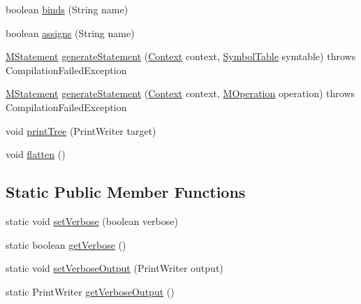 \begin{DoxyCompactItemize}
\item 
boolean \hyperlink{classorg_1_1tzi_1_1use_1_1parser_1_1soil_1_1ast_1_1_a_s_t_statement_af84e3da40a23acdb0af15a7e515d4e41}{binds} (String name)
\item 
boolean \hyperlink{classorg_1_1tzi_1_1use_1_1parser_1_1soil_1_1ast_1_1_a_s_t_statement_a931985140653af5b5100d44fe3125515}{assigns} (String name)
\item 
\hyperlink{classorg_1_1tzi_1_1use_1_1uml_1_1sys_1_1soil_1_1_m_statement}{M\-Statement} \hyperlink{classorg_1_1tzi_1_1use_1_1parser_1_1soil_1_1ast_1_1_a_s_t_statement_adde8e3bf9f9f8f7da35f048332f43911}{generate\-Statement} (\hyperlink{classorg_1_1tzi_1_1use_1_1parser_1_1_context}{Context} context, \hyperlink{classorg_1_1tzi_1_1use_1_1util_1_1soil_1_1_symbol_table}{Symbol\-Table} symtable)  throws Compilation\-Failed\-Exception 
\item 
\hyperlink{classorg_1_1tzi_1_1use_1_1uml_1_1sys_1_1soil_1_1_m_statement}{M\-Statement} \hyperlink{classorg_1_1tzi_1_1use_1_1parser_1_1soil_1_1ast_1_1_a_s_t_statement_a204e82d4871c6ce80f0badf73da6a553}{generate\-Statement} (\hyperlink{classorg_1_1tzi_1_1use_1_1parser_1_1_context}{Context} context, \hyperlink{classorg_1_1tzi_1_1use_1_1uml_1_1mm_1_1_m_operation}{M\-Operation} operation)  throws Compilation\-Failed\-Exception 
\item 
void \hyperlink{classorg_1_1tzi_1_1use_1_1parser_1_1soil_1_1ast_1_1_a_s_t_statement_adaad661f54ade344a14c2403b139ff4a}{print\-Tree} (Print\-Writer target)
\item 
void \hyperlink{classorg_1_1tzi_1_1use_1_1parser_1_1soil_1_1ast_1_1_a_s_t_statement_ad53aed7fc0b874700f0e8c0f8a45d452}{flatten} ()
\end{DoxyCompactItemize}
\subsection*{Static Public Member Functions}
\begin{DoxyCompactItemize}
\item 
static void \hyperlink{classorg_1_1tzi_1_1use_1_1parser_1_1soil_1_1ast_1_1_a_s_t_statement_a42177bbd06115cc599400de4826c8a9b}{set\-Verbose} (boolean verbose)
\item 
static boolean \hyperlink{classorg_1_1tzi_1_1use_1_1parser_1_1soil_1_1ast_1_1_a_s_t_statement_a82f37e1acb42eb486f53a53b13c5e959}{get\-Verbose} ()
\item 
static void \hyperlink{classorg_1_1tzi_1_1use_1_1parser_1_1soil_1_1ast_1_1_a_s_t_statement_a289feec5b3ca1adc747ae8fd1d86bd8a}{set\-Verbose\-Output} (Print\-Writer output)
\item 
static Print\-Writer \hyperlink{classorg_1_1tzi_1_1use_1_1parser_1_1soil_1_1ast_1_1_a_s_t_statement_a7fd0ef1935c08a784646ec99cfdf8501}{get\-Verbose\-Output} ()
\end{DoxyCompactItemize}
